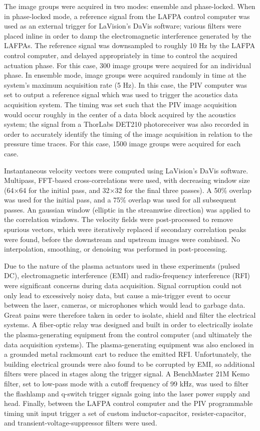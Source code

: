 The image groups were acquired in two modes: ensemble and phase-locked. 
When in phase-locked mode, a reference signal from the LAFPA control computer was used as an external trigger for LaVision's DaVis software; various filters were placed inline in order to damp the electromagnetic interference generated by the LAFPAs.
The reference signal was downsampled to roughly 10 Hz by the LAFPA control computer, and delayed appropriately in time to control the acquired actuation phase.
For this case, 300 image groups were acquired for an individual phase. 
In ensemble mode, image groups were acquired randomly in time at the system's maximum acquisition rate (5 Hz).
In this case, the PIV computer was set to output a reference signal which was used to trigger the acoustics data acquisition system.
The timing was set such that the PIV image acquisition would occur roughly in the center of a data block acquired by the acoustics system; the signal from a ThorLabs DET210 photoreceiver was also recorded in order to accurately identify the timing of the image acquisition in relation to the pressure time traces.
For this case, 1500 image groups were acquired for each case.

Instantaneous velocity vectors were computed using LaVision's DaVis software.
Multipass, FFT-based cross-correlations were used, with decreasing window size (64$\times$64 for the initial pass, and 32$\times$32 for the final three passes).
A 50\% overlap was used for the initial pass, and a 75\% overlap was used for all subsequent passes.
An gaussian window (elliptic in the streamwise direction) was applied to the correlation windows.
The velocity fields were post-processed to remove spurious vectors, which were iteratively replaced if secondary correlation peaks were found, before the downstream and upstream images were combined.
No interpolation, smoothing, or denoising was performed in post-processing.

Due to the nature of the plasma actuators used in these experiments (pulsed DC), electromagnetic interference (EMI) and radio-frequency interference (RFI) were significant concerns during data acquisition.
Signal corruption could not only lead to excessively noisy data, but cause a mis-trigger event to occur between the laser, cameras, or microphones which would lead to garbage data.
Great pains were therefore taken in order to isolate, shield and filter the electrical systems.
A fiber-optic relay was designed and built in order to electrically isolate the plasma-generating equipment from the control computer (and ultimately the data acquisition systems).
The plasma-generating equipment was also enclosed in a grounded metal rackmount cart to reduce the emitted RFI.
Unfortunately, the building electrical grounds were also found to be corrupted by EMI, so additional filters were placed in stages along the trigger signal.
A BenchMaster 21M Kemo filter, set to low-pass mode with a cutoff frequency of 99 kHz, was used to filter the flashlamp and q-switch trigger signals going into the laser power supply and head.
Finally, between the LAFPA control computer and the PIV programmable timing unit input trigger a set of custom inductor-capacitor, resister-capacitor, and transient-voltage-suppressor filters were used. 